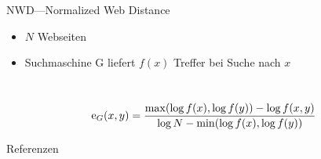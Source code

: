 \documentclass[aspectratio=1610]{beamer}%
\newcommand{\f}[1]{\ensuremath{f(#1)}}
\begin{document}
\begin{frame}{NWD---Normalized Web Distance}
\begin{itemize}
\item $N$ Webseiten
\item Suchmaschine G liefert $\f{x}$ Treffer bei Suche nach $x$
\end{itemize}
~\\
\[\textnormal{e}_G(x,y) = \frac
{\max(\log \f{x}, \log \f{y})- \log \f{x,y}}
{\log N - \min(\log \f{x}, \log \f{y})}
\]
\end{frame}
 
\begin{frame}{Referenzen}


\end{frame}
\end{document}
